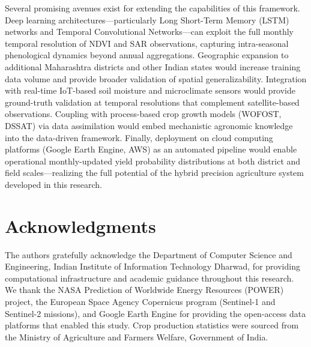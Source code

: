 \documentclass[conference]{IEEEtran}
\begin{document}
Several promising avenues exist for extending the capabilities of this
framework. Deep learning architectures---particularly Long Short-Term Memory
(LSTM) networks and Temporal Convolutional Networks---can exploit the full
monthly temporal resolution of NDVI and SAR observations, capturing
intra-seasonal phenological dynamics beyond annual aggregations. Geographic
expansion to additional Maharashtra districts and other Indian states would
increase training data volume and provide broader validation of spatial
generalizability. Integration with real-time IoT-based soil moisture and
microclimate sensors would provide ground-truth validation at temporal
resolutions that complement satellite-based observations. Coupling with
process-based crop growth models (WOFOST, DSSAT) via data assimilation
would embed mechanistic agronomic knowledge into the data-driven framework.
Finally, deployment on cloud computing platforms (Google Earth Engine, AWS)
as an automated pipeline would enable operational monthly-updated yield
probability distributions at both district and field scales---realizing the
full potential of the hybrid precision agriculture system developed in this
research.

\section*{Acknowledgments}

The authors gratefully acknowledge the Department of Computer Science and
Engineering, Indian Institute of Information Technology Dharwad, for
providing computational infrastructure and academic guidance throughout this
research. We thank the NASA Prediction of Worldwide Energy Resources (POWER)
project, the European Space Agency Copernicus program (Sentinel-1 and
Sentinel-2 missions), and Google Earth Engine for providing the open-access
data platforms that enabled this study. Crop production statistics were sourced
from the Ministry of Agriculture and Farmers Welfare, Government of India.
\end{document}
